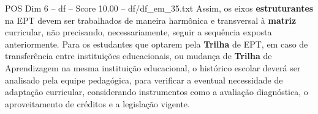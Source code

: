 \begin{textsample}{POS Dim 6 – df – Score 10.00 – df/df\_em\_35.txt}
Assim, os eixos \textbf{estruturantes} na EPT devem ser trabalhados de maneira harmônica e transversal à \textbf{matriz} curricular, não precisando, necessariamente, seguir a sequência exposta anteriormente.
Para os estudantes que optarem pela \textbf{Trilha} de EPT, em caso de transferência entre instituições educacionais, ou mudança de \textbf{Trilha} de Aprendizagem na mesma instituição educacional, o histórico escolar deverá ser analisado pela equipe pedagógica, para verificar a eventual necessidade de adaptação curricular, considerando instrumentos como a avaliação diagnóstica, o aproveitamento de créditos e a legislação vigente.

\end{textsample}
